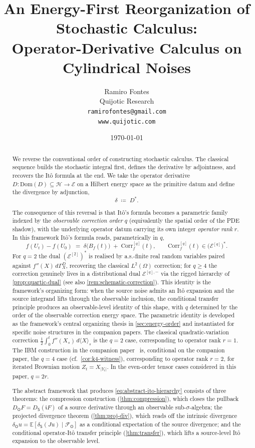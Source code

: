 \documentclass[11pt,reqno]{amsart}
\title[Energy-First Stochastic Calculus]{An Energy-First Reorganization of Stochastic Calculus:\\
       Operator-Derivative Calculus on Cylindrical Noises}
\author{Ramiro Fontes\\ Quijotic Research\\ \texttt{ramirofontes@gmail.com}\\ \texttt{www.quijotic.com}}
\date{\today}
\theoremstyle{plain}
\theoremstyle{definition}
\theoremstyle{remark}
\newcommand{\E}{\mathbb{E}}
\newcommand{\Hilb}{\mathcal{H}}
\newcommand{\Dom}{\mathrm{Dom}}
\newcommand{\Energy}{\mathcal{E}}
\newcommand{\Source}{\mathsf{S}}
\newcommand{\Obs}{\mathsf{O}}
\renewcommand{\iota}{\mathfrak{i}}
\newcommand{\IBM}{Z}
\newcommand{\Carre}{\Gamma}
\begin{document}
\begin{abstract}
We reverse the conventional order of constructing stochastic calculus.
The classical sequence builds the stochastic integral first, defines
the derivative by adjointness, and recovers the It\^o formula at the
end. We take the operator derivative
$D\colon\Dom(D)\subseteq\Hilb\to\Energy$ on a Hilbert energy space as
the primitive datum and define the divergence by adjunction,
\begin{equation}\label{eq:abstract-reversal}
  \delta\;\coloneqq\;D^{*}.
\end{equation}

The consequence of this reversal is that It\^o's formula becomes a
parametric family indexed by the \emph{observable correction order}
$q$ (equivalently the spatial order of the PDE shadow), with the
underlying operator datum carrying its own integer \emph{operator
rank} $r$. In this framework It\^o's formula reads, parametrically
in $q$,
\begin{equation}\label{eq:abstract-ito-hierarchy}
  f(U_t)-f(U_0)\;=\;\delta\bigl(B_f(t)\bigr)\;+\;\mathrm{Corr}_f^{[q]}(t),
  \qquad\mathrm{Corr}_f^{[q]}(t)\in\bigl(\Energy^{[q]}\bigr)^{*}.
\end{equation}
For $q=2$ the dual $(\Energy^{[2]})^{*}$ is realised by a.s.-finite
real random variables paired against $f''(X)\,d\Carre^{D}_{X}$,
recovering the classical $L^{2}(\Omega)$ correction; for $q\ge 4$ the
correction genuinely lives in a distributional dual $\Energy^{[q],-}$
via the rigged hierarchy of \cref{prop:quartic-dual} (see also
\cref{rem:schematic-correction}).
This identity is the framework's organizing form: when the source
noise admits an It\^o expansion and the source integrand lifts through
the observable inclusion, the conditional transfer principle produces
an observable-level identity of this shape, with $q$ determined by the
order of the observable correction energy space. The parametric
identity is developed as the framework's central organizing thesis in
\cref{sec:energy-order} and instantiated for specific noise structures
in the companion papers. The classical quadratic-variation correction
$\tfrac{1}{2}\!\int_{0}^{t}f''(X_s)\,d\langle X\rangle_{s}$ is the
$q=2$ case, corresponding to operator rank $r=1$. The IBM construction
in the companion paper~\cite{IBMPaper} is, conditional on the companion
paper, the $q=4$ case (cf.~\cref{cor:k4-witness}), corresponding to
operator rank $r=2$, for iterated Brownian motion
$\IBM_t=X_{|Y_t|}$. In the even-order tensor cases considered in this
paper, $q=2r$.

The abstract framework that produces
\eqref{eq:abstract-ito-hierarchy} consists of three theorems: the
compression construction (\cref{thm:compression}), which closes the
pullback $D_\Obs F=D_\Source(\iota F)$ of a source derivative through
an observable sub-$\sigma$-algebra; the projected divergence theorem
(\cref{thm:proj-div}), which reads off the intrinsic divergence
$\delta_\Obs u=\E[\delta_\Source(Ju)\mid\mathcal F_\Obs]$ as a
conditional expectation of the source divergence; and the conditional
operator-It\^o transfer principle (\cref{thm:transfer}), which lifts
a source-level It\^o expansion to the observable level.
\end{abstract}
\end{document}

